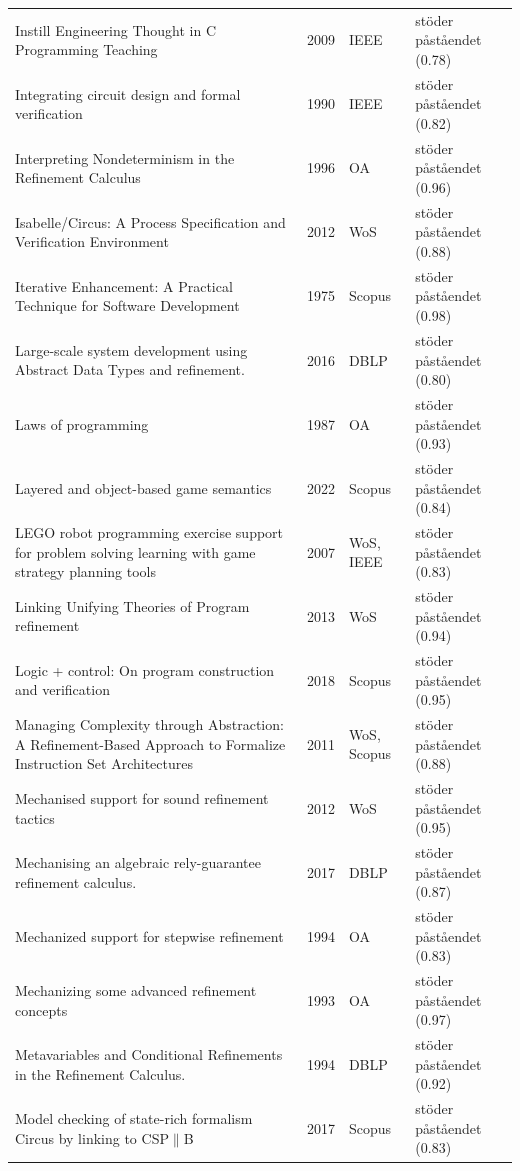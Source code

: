 \begin{longtable}{@{}%
  >{\raggedright\arraybackslash}p{}c%
  >{\raggedright\arraybackslash}p{}%
  >{\raggedright\arraybackslash}p{}@{}}
Instill Engineering Thought in C Programming Teaching & 2009 & IEEE & stöder påståendet (0.78) \\
Integrating circuit design and formal verification & 1990 & IEEE & stöder påståendet (0.82) \\
Interpreting Nondeterminism in the Refinement Calculus & 1996 & OA & stöder påståendet (0.96) \\
Isabelle/Circus: A Process Specification and Verification Environment & 2012 & WoS & stöder påståendet (0.88) \\
Iterative Enhancement: A Practical Technique for Software Development & 1975 & Scopus & stöder påståendet (0.98) \\
Large-scale system development using Abstract Data Types and refinement. & 2016 & DBLP & stöder påståendet (0.80) \\
Laws of programming & 1987 & OA & stöder påståendet (0.93) \\
Layered and object-based game semantics & 2022 & Scopus & stöder påståendet (0.84) \\
LEGO robot programming exercise support for problem solving learning with game strategy planning tools & 2007 & WoS, IEEE & stöder påståendet (0.83) \\
Linking Unifying Theories of Program refinement & 2013 & WoS & stöder påståendet (0.94) \\
Logic + control: On program construction and verification & 2018 & Scopus & stöder påståendet (0.95) \\
Managing Complexity through Abstraction: A Refinement-Based Approach to Formalize Instruction Set Architectures & 2011 & WoS, Scopus & stöder påståendet (0.88) \\
Mechanised support for sound refinement tactics & 2012 & WoS & stöder påståendet (0.95) \\
Mechanising an algebraic rely-guarantee refinement calculus. & 2017 & DBLP & stöder påståendet (0.87) \\
Mechanized support for stepwise refinement & 1994 & OA & stöder påståendet (0.83) \\
Mechanizing some advanced refinement concepts & 1993 & OA & stöder påståendet (0.97) \\
Metavariables and Conditional Refinements in the Refinement Calculus. & 1994 & DBLP & stöder påståendet (0.92) \\
Model checking of state-rich formalism Circus by linking to CSP$\parallel$B & 2017 & Scopus & stöder påståendet (0.83) \\

\end{longtable}
